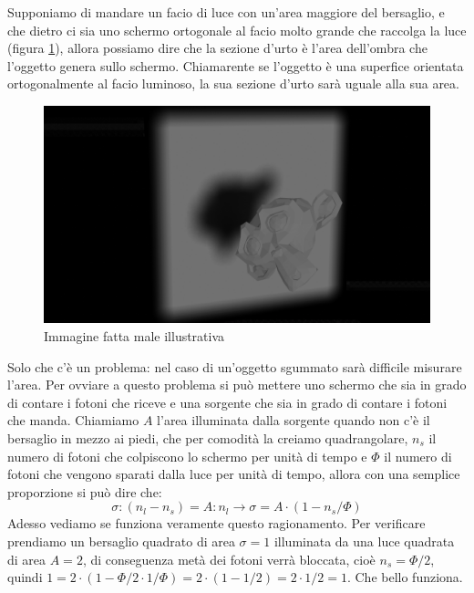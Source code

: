 \documentclass[11pt,a4paper]{report}
\begin{document}
		Supponiamo di mandare un facio di luce con un'area maggiore del bersaglio, e che dietro ci sia uno schermo ortogonale al facio molto grande che raccolga la luce (figura \ref{fig:ombra}), allora possiamo dire che la sezione d'urto è l'area dell'ombra che l'oggetto genera sullo schermo.\newline
		Chiamarente se l'oggetto è una superfice orientata ortogonalmente al facio luminoso, la sua sezione d'urto sarà uguale alla sua area.\newline
		\begin{figure}
			\centering
    		\includegraphics[width=\linewidth]{Immagini/ombra_con_blender.png}
    		\caption{Immagine fatta male illustrativa}
    		\label{fig:ombra}
		\end{figure}

		Solo che c'è un problema: nel caso di un'oggetto sgummato sarà difficile misurare l'area. Per ovviare a questo problema si può mettere uno schermo che sia in grado di contare i fotoni che riceve e una sorgente che sia in grado di contare i fotoni che manda.\newline
		Chiamiamo $A$ l'area illuminata dalla sorgente quando non c'è il bersaglio in mezzo ai piedi, che per comodità la creiamo quadrangolare, $n_s$ il numero di fotoni che colpiscono lo schermo per unità di tempo e $\Phi$ il numero di fotoni che vengono sparati dalla luce per unità di tempo, allora con una semplice proporzione si può dire che:
		\begin{equation}
			\sigma:(n_l-n_s)=A:n_l \rightarrow \sigma=A\cdot(1-n_s/\Phi)
			\label{eq:sigma_luce}
		\end{equation}
		Adesso vediamo se funziona veramente questo ragionamento.\newline
		Per verificare prendiamo un bersaglio quadrato di area $\sigma=1$ illuminata da una luce quadrata di area $A=2$, di conseguenza metà dei fotoni verrà bloccata, cioè $n_s=\Phi/2$, quindi $1=2\cdot(1-\Phi/2\cdot 1/\Phi)=2\cdot(1-1/2)=2\cdot 1/2=1$.\newline
		Che bello funziona.\newline
\end{document}
